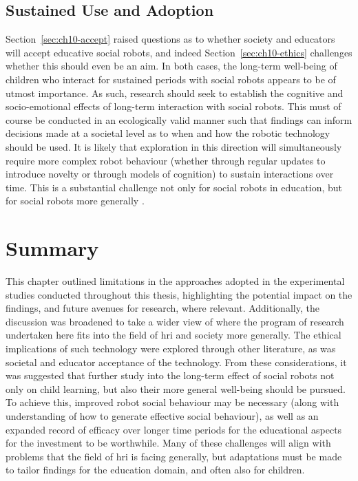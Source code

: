\subsection{Sustained Use and Adoption}
Section~\ref{sec:ch10-accept} raised questions as to whether society and educators will accept educative social robots, and indeed Section~\ref{sec:ch10-ethics} challenges whether this should even be an aim. In both cases, the long-term well-being of children who interact for sustained periods with social robots appears to be of utmost importance. As such, research should seek to establish the cognitive and socio-emotional effects of long-term interaction with social robots. This must of course be conducted in an ecologically valid manner such that findings can inform decisions made at a societal level as to when and how the robotic technology should be used. It is likely that exploration in this direction will simultaneously require more complex robot behaviour (whether through regular updates to introduce novelty or through models of cognition) to sustain interactions over time. This is a substantial challenge not only for social robots in education, but for social robots more generally \citep{leite2013social}.

\section{Summary} \label{sec:maindisc-summary}
This chapter outlined limitations in the approaches adopted in the experimental studies conducted throughout this thesis, highlighting the potential impact on the findings, and future avenues for research, where relevant. Additionally, the discussion was broadened to take a wider view of where the program of research undertaken here fits into the field of \acrshort{hri} and society more generally. The ethical implications of such technology were explored through other literature, as was societal and educator acceptance of the technology. From these considerations, it was suggested that further study into the long-term effect of social robots not only on child \gls{learning}, but also their more general well-being should be pursued. To achieve this, improved robot social behaviour may be necessary (along with understanding of how to generate effective social behaviour), as well as an expanded record of efficacy over longer time periods for the educational aspects for the investment to be worthwhile. Many of these challenges will align with problems that the field of \acrshort{hri} is facing generally, but adaptations must be made to tailor findings for the education domain, and often also for children.